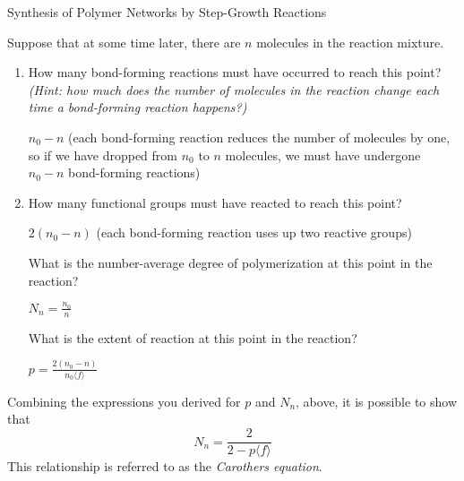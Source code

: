 \begin{activity}[extension]{Synthesis of Polymer Networks by Step-Growth Reactions}
\begin{ctqs}
	\question Suppose that at some time later, there are $n$ molecules in the reaction mixture.
	
		\begin{enumerate}
		
			\item How many bond-forming reactions must have occurred to reach this point?  \emph{(Hint: how much does the number of molecules in the reaction change each time a bond-forming reaction happens?)}
			
				\begin{solution}[0.5in]
					$n_0 - n$ (each bond-forming reaction reduces the number of molecules by one, so if we have dropped from $n_0$ to $n$ molecules, we must have undergone $n_0-n$ bond-forming reactions)
				\end{solution}
		
			\item How many functional groups must have reacted to reach this point?
			
				\begin{solution}[0.5in]
					$2(n_0-n)$ (each bond-forming reaction uses up two reactive groups)
				\end{solution}
			
			\question What is the number-average degree of polymerization at this point in the reaction?
			
				\begin{solution}[0.5in]
					$N_n = \frac{n_0}{n}$
				\end{solution}
			
			\question What is the extent of reaction at this point in the reaction?
			
				\begin{solution}[0.5in]
					$p = \frac{2(n_0-n)}{n_0\langle f \rangle}$
				\end{solution}
		
		\end{enumerate}
	
\end{ctqs}

\begin{infobox}
	Combining the expressions you derived for $p$ and $N_n$, above, it is possible to show that
	\begin{equation*}
		N_n = \frac{2}{2-p\langle f \rangle}
	\end{equation*}
	This relationship is referred to as the \emph{Carothers equation}.
\end{infobox}


\end{activity}

